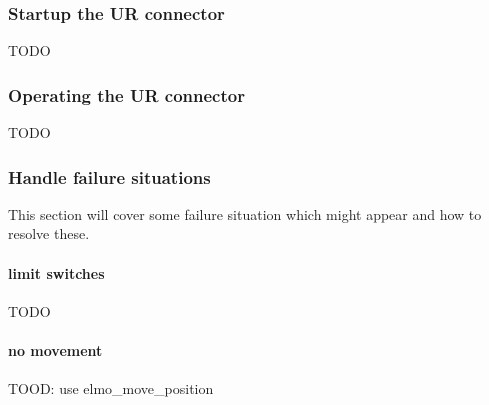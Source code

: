\documentclass[12pt,twoside]{report}
\begin{document}
\subsubsection{Startup the UR connector}
TODO

\subsubsection{Operating the UR connector}
TODO

\subsubsection{Handle failure situations}
This section will cover some failure situation which might appear and how to resolve these.

\paragraph{limit switches}
TODO

\paragraph{no movement}
TOOD: use elmo\_move\_position
\end{document}
